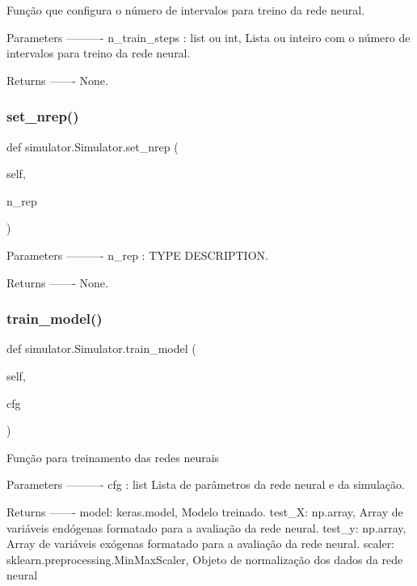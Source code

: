 \begin{DoxyVerb}Função que configura o número de intervalos para treino da rede neural.

Parameters
----------
n_train_steps : list ou int,
    Lista ou inteiro com o número de intervalos para treino da rede neural.

Returns
-------
None.\end{DoxyVerb}
 \mbox{\label{classsimulator_1_1Simulator_a29a214d80621ba7325bbb834d13f25c3}} 
\subsubsection{\texorpdfstring{set\+\_\+nrep()}{set\_nrep()}}
{\footnotesize\ttfamily def simulator.\+Simulator.\+set\+\_\+nrep (\begin{DoxyParamCaption}\item[{}]{self,  }\item[{}]{n\+\_\+rep }\end{DoxyParamCaption})}

\begin{DoxyVerb}Parameters
----------
n_rep : TYPE
    DESCRIPTION.

Returns
-------
None.\end{DoxyVerb}
 \mbox{\label{classsimulator_1_1Simulator_a6fd0ae4f2ef9932a555ffa1d46396e32}} 
\subsubsection{\texorpdfstring{train\+\_\+model()}{train\_model()}}
{\footnotesize\ttfamily def simulator.\+Simulator.\+train\+\_\+model (\begin{DoxyParamCaption}\item[{}]{self,  }\item[{}]{cfg }\end{DoxyParamCaption})}

\begin{DoxyVerb}Função para treinamento das redes neurais

Parameters
----------
cfg : list
    Lista de parâmetros da rede neural e da simulação.

Returns
-------
model: keras.model,
    Modelo treinado.
test_X: np.array,
    Array de variáveis endógenas formatado para a avaliação da rede neural.
test_y: np.array,
    Array de variáveis exógenas formatado para a avaliação da rede neural.
scaler: sklearn.preprocessing.MinMaxScaler,
    Objeto de normalização dos dados da rede neural\end{DoxyVerb}
 

